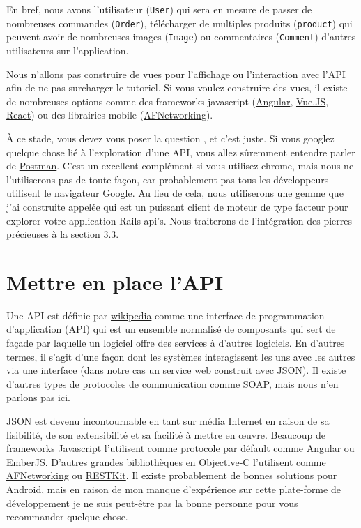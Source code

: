\documentclass[]{report}
\begin{document}
    En bref, nous avons l'utilisateur (\verb|User|) qui sera en mesure de passer de nombreuses commandes (\verb|Order|), télécharger de multiples produits (\verb|product|) qui peuvent avoir de nombreuses images (\verb|Image|) ou commentaires (\verb|Comment|) d'autres utilisateurs sur l'application.

    Nous n'allons pas construire de vues pour l'affichage ou l'interaction avec l'API afin de ne pas surcharger le tutoriel.  Si vous voulez construire des vues, il existe de nombreuses options comme des frameworks javascript (\href{https://angularjs.org/}{Angular}, \href{https://vuejs.org/}{Vue.JS}, \href{https://reactjs.org/}{React}) ou des librairies mobile (\href{https://github.com/AFNetworking/AFNetworking}{AFNetworking}).

    À ce stade, vous devez vous poser la question , et c'est juste. Si vous googlez quelque chose lié à l'exploration d'une API, vous allez sûremment entendre parler de \href{https://www.getpostman.com/}{Postman}. C'est un excellent complément si vous utilisez chrome, mais nous ne l'utiliserons pas de toute façon, car probablement pas tous les développeurs utilisent le navigateur Google. Au lieu de cela, nous utiliserons une gemme que j'ai construite appelée  qui est un puissant client de moteur de type facteur pour explorer votre application Rails api's. Nous traiterons de l'intégration des pierres précieuses à la section 3.3.

  \section{Mettre en place l'API}\label{section:setup_api}

    Une API est définie par \href{https://fr.wikipedia.org/wiki/Interface_de_programmation}{wikipedia} comme une interface de programmation d'application (API) qui  est un ensemble normalisé de composants qui sert de façade par laquelle un logiciel offre des services à d'autres logiciels. En d'autres termes, il s'agit d'une façon dont les systèmes interagissent les uns avec les autres via une interface (dans notre cas un service web construit avec JSON). Il existe d'autres types de protocoles de communication comme SOAP, mais nous n'en parlons pas ici.

    JSON est devenu incontournable en tant sur média Internet en raison de sa lisibilité, de son extensibilité et sa facilité à mettre en œuvre. Beaucoup de frameworks Javascript l'utilisent comme protocole par défault comme \href{https://angularjs.org/}{Angular} ou \href{http://emberjs.com/}{EmberJS}. D'autres grandes bibliothèques en Objective-C l'utilisent  comme \href{https://github.com/AFNetworking/AFNetworking}{AFNetworking} ou \href{http://restkit.org/}{RESTKit}. Il existe probablement de bonnes solutions pour Android, mais en raison de mon manque d'expérience sur cette plate-forme de développement je ne suis peut-être pas la bonne personne pour vous recommander quelque chose.
\end{document}
